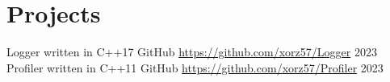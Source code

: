 \section{Projects}

\begin{cventries}
    \cventryiv
        {Logger written in C++17}
        {GitHub}
        {\url{https://github.com/xorz57/Logger}}
        {2023}
    \cventryiv
        {Profiler written in C++11}
        {GitHub}
        {\url{https://github.com/xorz57/Profiler}}
        {2023}
\end{cventries}
